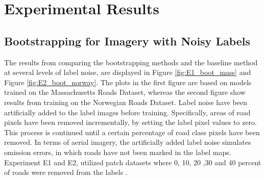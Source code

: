 \section{Experimental Results}
\label{sec:experimentalResults}
\subsection{Bootstrapping for Imagery with Noisy Labels}
\label{sec:results_bootstrapping}

The results from comparing the bootstrapping methods and the baseline method at several levels of label noise, are displayed in Figure \ref{fig:E1_boot_mass} and Figure \ref{fig:E2_boot_norway}. The plots in the first figure are based on models trained on the Massachusetts Roads Dataset, whereas the second figure show results from training on the Norwegian Roads Dataset. Label noise have been artificially added to the label images before training. Specifically, areas of road pixels have been removed incrementally, by setting the label pixel values to zero. This process is continued until a certain percentage of road class pixels have been removed. In terms of aerial imagery, the artificially added label noise simulates omission errors, in which roads have not been marked in the label maps. Experiment E1 and E2, utilized patch datasets where 0, 10, 20 ,30 and 40 percent of roads were removed from the labels .\\

